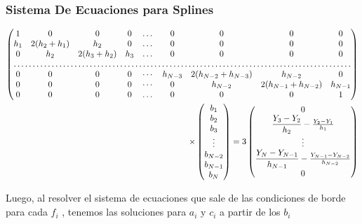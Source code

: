\mode*
\begin{frame}[label=FrameSistemaEcuacionesSplines]
  \frametitle<presentation>{Sistema De Ecuaciones para Splines}

  \tiny
  \begin{equation}
   \begin{split}
      \begin{pmatrix}
	1 &     0      &    0    & 0 & \dots & 0 & 0 & 0 & 0 \\
	h_1& 2(h_2+h_1)& h_2     & 0 & \dots & 0 & 0 & 0 & 0 \\
	0  &  h_2  & 2(h_3+h_2) &h_3 & \dots & 0 & 0 & 0 & 0 \\
	\hdotsfor{9}\\
	0 & 0 & 0 & 0 & \cdots & h_{N-3} & 2(h_{N-2}+h_{N-3}) & h_{N-2} & 0 \\
	0 & 0 & 0 & 0 & \cdots & 0 & h_{N-2} &2(h_{N-1}+h_{N-2}) & h_{N-1} \\
	0 &     0      &    0    & 0 & \dots & 0 & 0 & 0 & 1
      \end{pmatrix} 
       \\
      \times 
      \begin{pmatrix}
	b_1 \\ b_2 \\ b_3 \\ \vdots \\ b_{N-2} \\ b_{N-1} \\ b_{N}
      \end{pmatrix} 
      = 
      3
      \begin{pmatrix}
	0 \\ 
	\dfrac{ Y_3 - Y_2 }{h_2} - \frac{ Y_2 - Y_1 }{h_1} \\
	\vdots \\
	\dfrac{ Y_N - Y_{N-1} }{h_{N-1}} - \frac{ Y_{N-1} - Y_{N-2} }{h_{N-2}} \\
	0
      \end{pmatrix}
    \end{split}
  \end{equation}
\end{frame}


Luego, al resolver el sistema de ecuaciones que sale de las condiciones
de borde para cada $f_i$ , tenemos las soluciones para $a_i$ y $c_i$ a partir de los 
$b_i$

\mode*

